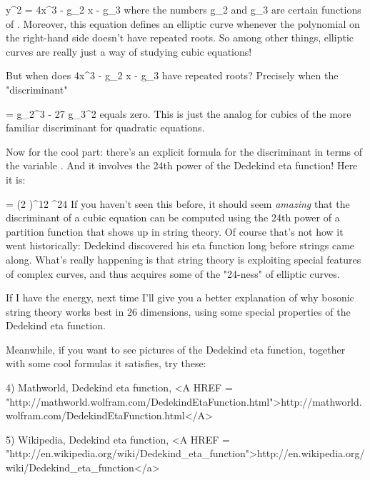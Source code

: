                         y^{2} = 4x^{3} - g_{2} x - g_{3}
where the numbers g_{2} and g_{3} are certain functions of 
\tau .  Moreover,
this equation defines an elliptic curve whenever the polynomial on
the right-hand side doesn't have repeated roots.  So among other things,
elliptic curves are really just a way of studying cubic equations!

But when does 4x^{3} - g_{2} x - g_{3} have
repeated roots?  Precisely when the "discriminant"

\Delta  = g_{2}^{3} - 27 g_{3}^{2} 
equals zero.  This is just the analog for cubics of the more familiar
discriminant for quadratic equations.  

Now for the cool part: there's an explicit formula for the discriminant
in terms of the variable \tau .  And it involves the 24th power of the 
Dedekind eta function!  Here it is:

                     \Delta  = (2 \pi )^{12} \eta ^{24} 
If you haven't seen this before, it should seem \emph{amazing} that the
discriminant of a cubic equation can be computed using the 24th power of
a partition function that shows up in string theory.  Of course that's
not how it went historically: Dedekind discovered his eta function long
before strings came along.  What's really happening is that string
theory is exploiting special features of complex curves, and thus acquires
some of the "24-ness" of elliptic curves.

If I have the energy, next time I'll give you a better explanation of
why bosonic string theory works best in 26 dimensions, using some
special properties of the Dedekind eta function.

Meanwhile, if you want to see pictures of the Dedekind eta function,
together with some cool formulas it satisfies, try these:

4) Mathworld, Dedekind eta function, 
<A HREF = "http://mathworld.wolfram.com/DedekindEtaFunction.html">http://mathworld.wolfram.com/DedekindEtaFunction.html</A>

5) Wikipedia, Dedekind eta function,
<A HREF = "http://en.wikipedia.org/wiki/Dedekind_eta_function">http://en.wikipedia.org/wiki/Dedekind_eta_function</a>




